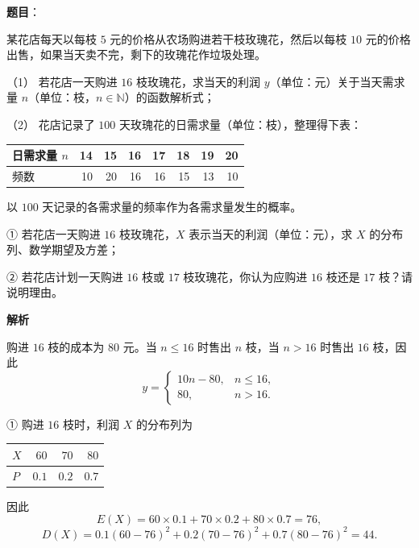 \begin{answer}

\textbf{题目}：

某花店每天以每枝 $5$ 元的价格从农场购进若干枝玫瑰花，然后以每枝 $10$ 元的价格出售，如果当天卖不完，剩下的玫瑰花作垃圾处理。

（1） 若花店一天购进 $16$ 枝玫瑰花，求当天的利润 $y$（单位：元）关于当天需求量 $n$（单位：枝，$n\in\mathbb N$）的函数解析式；

（2） 花店记录了 $100$ 天玫瑰花的日需求量（单位：枝），整理得下表：

\begin{center}
\begingroup\setlength{\tabcolsep}{4pt}
\begin{tabular}{lrrrrrrr}
\toprule
日需求量 $n$ & 14 & 15 & 16 & 17 & 18 & 19 & 20 \\
\midrule
频数 & 10 & 20 & 16 & 16 & 15 & 13 & 10 \\
\bottomrule
\end{tabular}
\endgroup
\end{center}

以 $100$ 天记录的各需求量的频率作为各需求量发生的概率。

① 若花店一天购进 $16$ 枝玫瑰花，$X$ 表示当天的利润（单位：元），求 $X$ 的分布列、数学期望及方差；

② 若花店计划一天购进 $16$ 枝或 $17$ 枝玫瑰花，你认为应购进 $16$ 枝还是 $17$ 枝？请说明理由。

\textbf{解析}


购进 $16$ 枝的成本为 $80$ 元。当 $n\leqslant16$ 时售出 $n$ 枝，当 $n>16$ 时售出 $16$ 枝，因此
\nopagebreak[4]
\[
y=\begin{cases}
10n-80,&n\leqslant16,\\
80,&n>16.
\end{cases}
\]


① 购进 $16$ 枝时，利润 $X$ 的分布列为

\begin{center}
\begin{tabular}{lrrr}
\toprule
$X$ & $60$ & $70$ & $80$ \\
\midrule
$P$ & $0.1$ & $0.2$ & $0.7$ \\
\bottomrule
\end{tabular}
\end{center}

因此
\nopagebreak[4]
\[
E(X)=60\times0.1+70\times0.2+80\times0.7=76,
\]
\nopagebreak[4]
\[
D(X)=0.1(60-76)^2+0.2(70-76)^2+0.7(80-76)^2=44.
\]


\end{answer}

